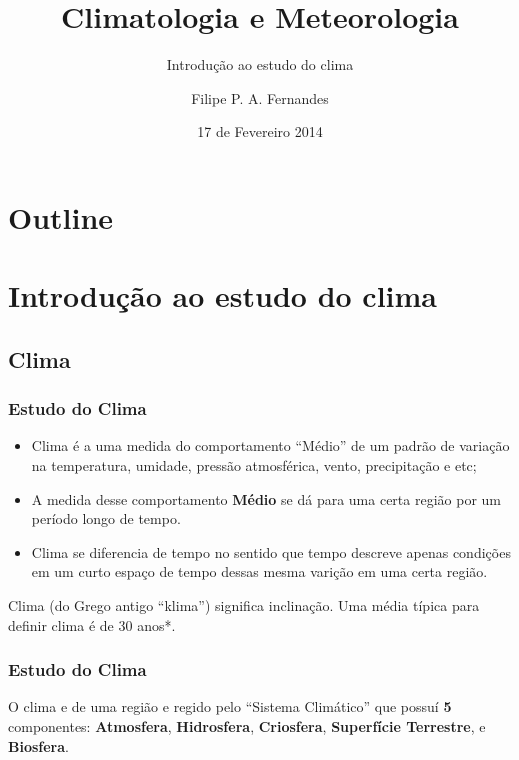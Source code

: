 \title[Aula 03]{Climatologia e Meteorologia}
\subtitle{Introdução ao estudo do clima}
\author[Filipe Fernandes]{Filipe P. A. Fernandes}
\date[Fevereiro 2014]{17 de Fevereiro 2014}




\begin{frame}[plain]
  \titlepage
\end{frame}

\section*{Outline}
\begin{frame}
\tableofcontents
\end{frame}

\section{Introdução ao estudo do clima}
\subsection{Clima}

\begin{frame}
\frametitle{Estudo do Clima}
  \begin{itemize}[<+-| alert@+>]
  \item Clima é a uma medida do comportamento ``Médio'' de um padrão de
        variação na temperatura, umidade, pressão atmosférica, vento,
        precipitação e etc;
  \item A medida desse comportamento {\bf Médio} se dá para uma certa região por
        um período longo de tempo.
  \item Clima se diferencia de tempo no sentido que tempo descreve apenas
        condições em um curto espaço de tempo dessas mesma varição em uma certa
        região.
  \end{itemize}
\pause
{\scriptsize Clima (do Grego antigo ``klima'') significa inclinação.  Uma média
típica para definir clima é de 30 anos*.}
\end{frame}

\begin{frame}
\frametitle{Estudo do Clima}
  \begin{block}{}
    O clima e de uma região e regido pelo ``Sistema Climático'' que possuí
    {\bf 5}     componentes: {\bf Atmosfera}, {\bf Hidrosfera}, {\bf Criosfera},
    {\bf Superfície Terrestre}, e {\bf Biosfera}.
  \end{block}
\end{frame}

